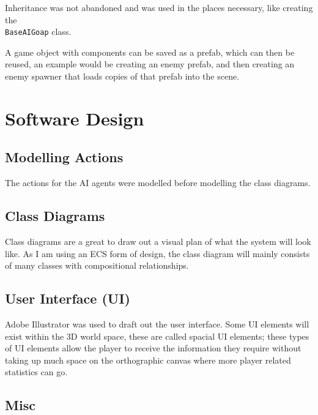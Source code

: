 \documentclass[12pt]{report}
\begin{document}
Inheritance was not abandoned and was used in the places necessary, like creating the \\ \lstinline{BaseAIGoap} class. %

A game object with components can be saved as a prefab, which can then be reused, an example would be creating an enemy prefab, and then creating an enemy spawner that loads copies of that prefab into the scene.

\section{Software Design}

\subsection{Modelling Actions}
The actions for the AI agents were modelled before modelling the class diagrams. 

\subsection{Class Diagrams}
Class diagrams are a great to draw out a visual plan of what the system will look like. As I am using an ECS form of design, the class diagram will mainly consists of many classes with compositional relationships.

\subsection{User Interface (UI)}
Adobe Illustrator was used to draft out the user interface. Some UI elements will exist within the 3D world space, these are called spacial UI elements; these types of UI elements allow the player to receive the information they require without taking up much space on the orthographic canvas where more player related statistics can go.\cite{UIChoices}

\subsection{Misc}

\end{document}
